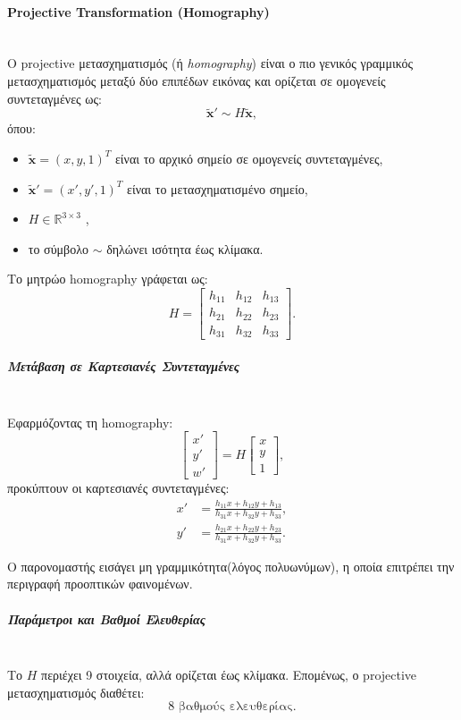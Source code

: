 \documentclass[12pt]{article}
\begin{document}
\paragraph{Projective Transformation (Homography)}
\mbox{}\\
Ο projective μετασχηματισμός (ή \textit{homography}) είναι ο πιο γενικός γραμμικός μετασχηματισμός μεταξύ δύο επιπέδων εικόνας και ορίζεται σε ομογενείς συντεταγμένες ως:
\[
\tilde{\mathbf{x}}' \sim H \tilde{\mathbf{x}},
\]
όπου:
\begin{itemize}
    \item \(\tilde{\mathbf{x}} = (x,y,1)^T\) είναι το αρχικό σημείο σε ομογενείς συντεταγμένες,
    \item \(\tilde{\mathbf{x}}' = (x',y',1)^T\) είναι το μετασχηματισμένο σημείο,
    \item \(H \in \mathbb{R}^{3 \times 3}\) ,
    \item το σύμβολο \(\sim\) δηλώνει ισότητα έως κλίμακα.
\end{itemize}

Το μητρώο  homography γράφεται ως:
\[
H =
\begin{bmatrix}
h_{11} & h_{12} & h_{13} \\
h_{21} & h_{22} & h_{23} \\
h_{31} & h_{32} & h_{33}
\end{bmatrix}.
\]

\subparagraph{Μετάβαση σε Καρτεσιανές Συντεταγμένες}
\mbox{}\\
Εφαρμόζοντας τη homography:
\[
\begin{bmatrix}
x' \\ y' \\ w'
\end{bmatrix}
=
H
\begin{bmatrix}
x \\ y \\ 1
\end{bmatrix},
\]
προκύπτουν οι καρτεσιανές συντεταγμένες:
\[
\begin{aligned}
x' &= \frac{h_{11}x + h_{12}y + h_{13}}{h_{31}x + h_{32}y + h_{33}}, \\
y' &= \frac{h_{21}x + h_{22}y + h_{23}}{h_{31}x + h_{32}y + h_{33}}.
\end{aligned}
\]

Ο παρονομαστής εισάγει μη γραμμικότητα(λόγος πολυωνύμων), η οποία επιτρέπει την περιγραφή προοπτικών φαινομένων.

\subparagraph{Παράμετροι και Βαθμοί Ελευθερίας}
\mbox{}\\
Το \(H\) περιέχει 9 στοιχεία, αλλά ορίζεται έως κλίμακα. Επομένως, ο projective μετασχηματισμός διαθέτει:
\[
8 \text{ βαθμούς ελευθερίας}.
\]
\end{document}
